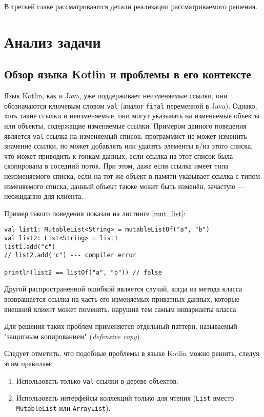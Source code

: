 \documentclass[specification,annotation,times]{itmo-student-thesis}
\begin{document}
В третьей главе рассматриваются детали реализации рассматриваемого решения.


\chapter{Анализ задачи}

\section{Обзор языка Kotlin и проблемы в его контексте}\label{existing_kotlin}

Язык Kotlin, как и Java, уже поддерживает неизменяемые ссылки, они обозначаются ключевым словом \texttt{val} (аналог \texttt{final} переменной в Java\cite{jvm8-spec}). 
Однако, хоть такие ссылки и неизменяемые, они могут указывать на изменяемые объекты или объекты, содержащие изменяемые ссылки.
Примером данного поведения является \texttt{val} ссылка на изменяемый список: программист не может изменить значение ссылки, но может добавлять или удалять элементы в/из этого списка, что может приводить к гонкам данных, если ссылка на этот список была скопирована в соседний поток.
При этом, даже если ссылка имеет типа неизменяемого списка, если на тот же объект в памяти указывает ссылка с типом изменяемого списка, данный объект также может быть изменён, зачастую --- неожиданно для клиента.

Пример такого поведения показан на листинге \ref{mut_list}:

\begin{lstlisting}[float=h!,caption={Один список с разными типами ссылок},label={mut_list}]
val list1: MutableList<String> = mutableListOf("a", "b")
val list2: List<String> = list1
list1.add("c")
// list2.add("c") --- compiler error

println(list2 == listOf("a", "b")) // false
\end{lstlisting}

Другой распространенной ошибкой является случай, когда из метода класса возвращается ссылка на часть его изменяемых приватных данных, которые внешний клиент может поменять, нарушив тем самым инварианты класса.

Для решения таких проблем применяется отдельный паттерн, называемый "защитным копированием" (\textit{defensive copy}).

Следует отметить, что подобные проблемы в языке Kotlin можно решить, следуя этим правилам:

\begin{enumerate}
	\item Использовать только \texttt{val} ссылки в дереве объектов.
	\item Использовать интерфейсы коллекций только для чтения (\texttt{List} вместо \texttt{MutableList} или \texttt{ArrayList}).
\end{enumerate}
\end{document}
